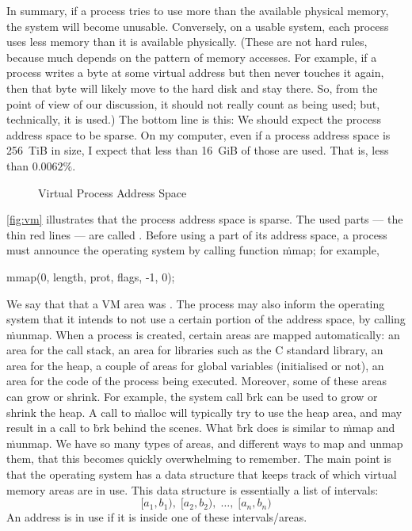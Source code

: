 In summary,
  if a process tries to use more than the available physical memory,
  the system will become unusable.
Conversely,
  on a usable system,
  each process uses less memory than it is available physically.
(These are not hard rules,
  because much depends on the pattern of memory accesses.
For example,
  if a process writes a byte at some virtual address
  but then never touches it again,
  then that byte will likely move to the hard disk and stay there.
So, from the point of view of our discussion,
  it should not really count as being used;
  but, technically, it is used.)
The bottom line is this:
  We should expect the process address space to be sparse.
On my computer,
  even if a process address space is 256~TiB in size,
  I expect that less than 16~GiB of those are used.
That is, less than $0.0062\%$.

\begin{figure}
\begin{center}
\end{center}
\caption{Virtual Process Address Space}
\label{fig:vm}
\end{figure}

\autoref{fig:vm} illustrates that the process address space is sparse.
The used parts --- the thin red lines --- are called .
Before using a part of its address space,
  a process must announce the operating system by calling function \.{mmap};
for example,
\begin{ccode}
  mmap(0, length, prot, flags, -1, 0);
\end{ccode}
We say that that a VM area was .
The process may also inform the operating system that it intends
  to not use a certain portion of the address space,
  by calling \.{munmap}.
When a process is created,
  certain areas are mapped automatically:
  an area for the call stack,
  an area for libraries such as the C standard library,
  an area for the heap,
  a couple of areas for global variables (initialised or not),
  an area for the code of the process being executed.
Moreover, some of these areas can grow or shrink.
For example,
  the system call \.{brk} can be used to grow or shrink the heap.
A call to \.{malloc} will typically try to use the heap area,
  and may result in a call to \.{brk} behind the scenes.
What \.{brk} does is similar to \.{mmap} and \.{munmap}.
We have so many types of areas,
  and different ways to map and unmap them,
  that this becomes quickly overwhelming to remember.
The main point is that the operating system has a data structure
  that keeps track of which virtual memory areas are in use.
This data structure is essentially a list of intervals:
\[
  [a_1,b_1),\; [a_2,b_2),\;\ldots,\;[a_n,b_n)
\]
An address is in use if it is inside one of these intervals/areas.

